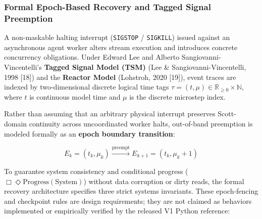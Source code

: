 \documentclass[
  10pt,letterpaper]{article}
\begin{document}
\subsubsection{Formal Epoch-Based Recovery and Tagged Signal
Preemption}\label{formal-epoch-based-recovery-and-tagged-signal-preemption}

A non-maskable halting interrupt (\texttt{SIGSTOP} / \texttt{SIGKILL})
issued against an asynchronous agent worker alters stream execution and
introduces concrete concurrency obligations. Under Edward Lee and
Alberto Sangiovanni-Vincentelli's \textbf{Tagged Signal Model (TSM)}
(Lee \& Sangiovanni-Vincentelli, 1998 {[}18{]}) and the \textbf{Reactor
Model} (Lohstroh, 2020 {[}19{]}), event traces are indexed by
two-dimensional discrete logical time tags
\(\tau = (t, \mu) \in \mathbb{R}_{\ge 0} \times \mathbb{N}\), where
\(t\) is continuous model time and \(\mu\) is the discrete microstep
index.

Rather than assuming that an arbitrary physical interrupt preserves
Scott-domain continuity across uncoordinated worker halts, out-of-band
preemption is modeled formally as an \textbf{epoch boundary transition}:

\[E_k = (t_k, \mu_k) \xrightarrow{\text{preempt}} E_{k+1} = (t_k, \mu_k + 1)\]

To guarantee system consistency and conditional progress
(\(\Box \Diamond \text{Progress}(\text{System})\)) without data
corruption or dirty reads, the formal recovery architecture specifies
three strict systems invariants. These epoch-fencing and checkpoint rules
are design requirements; they are not claimed as behaviors implemented or
empirically verified by the released V1 Python reference:
\end{document}
